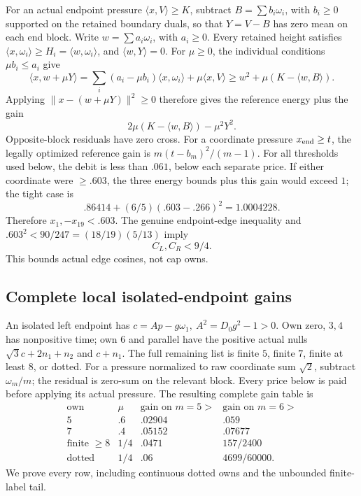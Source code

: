 \documentclass[11pt]{article}
\theoremstyle{definition}
\theoremstyle{remark}
\newcommand{\ip}[2]{\langle #1,#2\rangle}
\newcommand{\norm}[1]{\lVert #1\rVert}
\begin{document}
For an actual endpoint pressure \(\ip{x}{V}\geq K\),
subtract \(B=\sum b_i\omega_i\), with \(b_i\geq0\) supported
on the retained boundary duals, so that \(Y=V-B\) has zero mean
on each end block. Write \(w=\sum a_i\omega_i\), with \(a_i\geq0\).
Every retained height satisfies \(\ip x{\omega_i}\geq H_i
=\ip w{\omega_i}\), and \(\ip wY=0\).
For \(\mu\geq0\), the individual conditions \(\mu b_i\leq a_i\)
give
\[
 \ip x{w+\mu Y}
 =\sum_i(a_i-\mu b_i)\ip x{\omega_i}+\mu\ip xV
 \geq w^2+\mu(K-\ip wB).
\]
Applying \(\norm{x-(w+\mu Y)}^2\geq0\) therefore gives the
reference energy plus the gain
\[
 2\mu(K-\ip{w}{B})-\mu^2Y^2.
\]
Opposite-block residuals have zero cross.
For a coordinate pressure \(x_{\rm end}\geq t\),
the legally optimized reference gain is
\(m(t-b_m)^2/(m-1)\).
For all thresholds used below, the debit is
less than \(.061\), below each separate price.
If either coordinate were \(\geq.603\), the
three energy bounds plus this gain would exceed
\(1\); the tight case is
\[
 .86414+(6/5)(.603-.266)^2=1.0004228.
\]
Therefore \(x_1,\allowbreak -x_{19}<.603\).
The genuine endpoint-edge inequality and
\(.603^2<90/247=(18/19)(5/13)\) imply
\begin{equation}\label{app:eq:A18shortends}
 C_L,C_R<9/4.
\end{equation}
This bounds actual edge cosines, not cap owns.

\subsection{Complete local isolated-endpoint gains}
An isolated left endpoint has
\(c=A p-g\omega_1,\ A^2=D_0g^2-1>0\).
Own zero, \(3,4\) has nonpositive time; own
\(6\) and parallel have the positive actual
nulls \(\sqrt3c+2n_1+n_2\) and \(c+n_1\).
The full remaining list is finite \(5\), finite
\(7\), finite at least \(8\), or dotted.
For a pressure normalized to raw coordinate
sum \(\sqrt2\), subtract \(\omega_m/m\);
the residual is zero-sum on the relevant block.
Every price below is paid before applying its
actual pressure. The resulting complete gain
table is
\[
\begin{array}{c|c|c|c}
\text{own}&\mu&\text{gain on }m=5>&
 \text{gain on }m=6>\\ \hline
5&.6&.02904&.059\\
7&.4&.05152&.07677\\
\text{finite }\geq8&1/4&.0471&157/2400\\
\text{dotted}&1/4&.06&4699/60000.
\end{array}
\]
We prove every row, including continuous dotted
owns and the unbounded finite-label tail.
\end{document}
